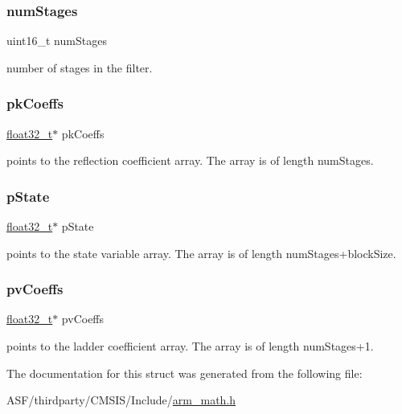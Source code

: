 \subsubsection{\texorpdfstring{numStages}{numStages}}
{\footnotesize\ttfamily uint16\+\_\+t num\+Stages}

number of stages in the filter. \mbox{\label{structarm__iir__lattice__instance__f32_a994889c5c4a866c50a0ee63326378816}} 
\subsubsection{\texorpdfstring{pkCoeffs}{pkCoeffs}}
{\footnotesize\ttfamily \mbox{\hyperlink{arm__math_8h_a4611b605e45ab401f02cab15c5e38715}{float32\+\_\+t}}$\ast$ pk\+Coeffs}

points to the reflection coefficient array. The array is of length num\+Stages. \mbox{\label{structarm__iir__lattice__instance__f32_a335c87e6fdc4b96601d95a5de8b9c463}} 
\subsubsection{\texorpdfstring{pState}{pState}}
{\footnotesize\ttfamily \mbox{\hyperlink{arm__math_8h_a4611b605e45ab401f02cab15c5e38715}{float32\+\_\+t}}$\ast$ p\+State}

points to the state variable array. The array is of length num\+Stages+block\+Size. \mbox{\label{structarm__iir__lattice__instance__f32_a0f8815744fade9c580d44277ff802308}} 
\subsubsection{\texorpdfstring{pvCoeffs}{pvCoeffs}}
{\footnotesize\ttfamily \mbox{\hyperlink{arm__math_8h_a4611b605e45ab401f02cab15c5e38715}{float32\+\_\+t}}$\ast$ pv\+Coeffs}

points to the ladder coefficient array. The array is of length num\+Stages+1. 

The documentation for this struct was generated from the following file\+:\begin{DoxyCompactItemize}
\item 
A\+S\+F/thirdparty/\+C\+M\+S\+I\+S/\+Include/\mbox{\hyperlink{arm__math_8h}{arm\+\_\+math.\+h}}\end{DoxyCompactItemize}
